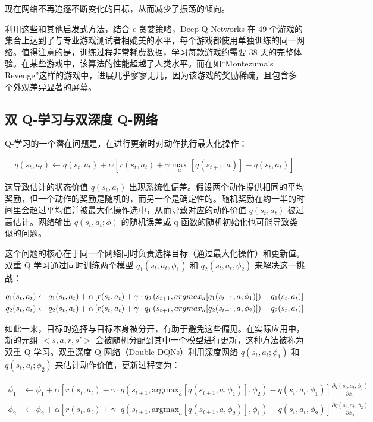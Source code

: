 \documentclass[lang=cn,newtx,10pt,scheme=chinese]{elegantbook}
\begin{document}
现在网络不再追逐不断变化的目标，从而减少了振荡的倾向。

利用这些和其他启发式方法，结合 \(\epsilon\)-贪婪策略，Deep Q-Networks 在 49 个游戏的集合上达到了与专业游戏测试者相媲美的水平，每个游戏都使用单独训练的同一网络。值得注意的是，训练过程非常耗费数据，学习每款游戏约需要 38 天的完整体验。在某些游戏中，该算法的性能超越了人类水平。而在如“Montezuma's Revenge”这样的游戏中，进展几乎寥寥无几，因为该游戏的奖励稀疏，且包含多个外观差异显著的屏幕。

\subsection{双 Q-学习与双深度 Q-网络}
Q-学习的一个潜在问题是，在进行更新时对动作执行最大化操作：

\begin{equation}
q(s_t, a_t) \leftarrow q(s_t, a_t) + \alpha \left[ r(s_t, a_t) + \gamma \max_{a} [q(s_{t+1}, a)] - q(s_t, a_t) \right] 
\end{equation}

这导致估计的状态价值 \(q(s_t, a_t)\) 出现系统性偏差。假设两个动作提供相同的平均奖励，但一个动作的奖励是随机的，而另一个是确定性的。随机奖励在约一半的时间里会超过平均值并被最大化操作选中，从而导致对应的动作价值 \(q(s_t, a_t)\) 被过高估计。网络输出 \(q(s_t, a_t; \phi)\) 的随机误差或 q-函数的随机初始化也可能导致类似的问题。

这个问题的核心在于同一个网络同时负责选择目标（通过最大化操作）和更新值。双重 Q-学习通过同时训练两个模型 \(q_1(s_t, a_t, \phi_1)\) 和 \(q_2(s_t, a_t, \phi_2)\) 来解决这一挑战：


\begin{align}
&q_1(s_t, a_t) \leftarrow q_1(s_t, a_t) + \alpha \left[ r(s_t, a_t) + \gamma \cdot q_2 \left( s_{t+1}, argmax_{a} [q_1(s_{t+1}, a, \phi_1)] \right) - q_1(s_t, a_t) \right] \notag\\
&q_2(s_t, a_t) \leftarrow q_2(s_t, a_t) + \alpha \left[ r(s_t, a_t) + \gamma \cdot q_1 \left( s_{t+1}, argmax_{a} [q_2(s_{t+1}, a, \phi_2)] \right) - q_2(s_t, a_t) \right] 
\end{align} 



如此一来，目标的选择与目标本身被分开，有助于避免这些偏见。在实际应用中，新的元组 \(<s, a, r, s'>\) 会被随机分配到其中一个模型进行更新，这种方法被称为双重 Q-学习。双重深度 Q-网络（Double DQNs）利用深度网络 \(q(s_t, a_t; \phi_1)\) 和 \(q(s_t, a_t; \phi_2)\) 来估计动作价值，更新过程变为：

\begin{equation}
\begin{aligned}
\phi_1 &\leftarrow \phi_1 + \alpha \left[ r(s_t, a_t) + \gamma \cdot q \left( s_{t+1}, \text{argmax}_a [q(s_{t+1}, a, \phi_1)], \phi_2 \right) - q(s_t, a_t, \phi_1) \right] \frac{\partial q(s_t, a_t, \phi_1)}{\partial \phi_1} \\
\phi_2 &\leftarrow \phi_2 + \alpha \left[ r(s_t, a_t) + \gamma \cdot q \left( s_{t+1}, \text{argmax}_a [q(s_{t+1}, a, \phi_2)], \phi_1 \right) - q(s_t, a_t, \phi_2) \right] \frac{\partial q(s_t, a_t, \phi_2)}{\partial \phi_2}
\end{aligned} 
\end{equation}
\end{document}
